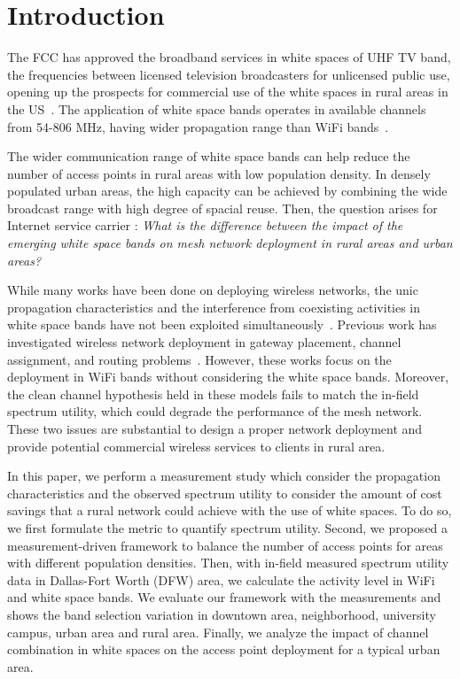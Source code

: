 \section{Introduction}
\label{sec:introduction}



The FCC has approved the broadband services in white spaces of UHF TV band,
the frequencies between licensed television broadcasters 
for unlicensed public use, opening up the prospects for
commercial use of the white spaces in rural areas in the US~\cite{carlson}.
The application of white space bands operates in available channels from 
54-806 MHz, having wider propagation range than
WiFi bands~\cite{balanis2012antenna}. 

The wider communication range 
of white space bands can help reduce the number of access points 
in rural areas with low population density. In densely populated urban areas,
the high capacity can be achieved by combining the wide broadcast range 
with high degree of spacial reuse.
Then, the question arises for Internet service carrier
: {\it What is the difference between the impact of the emerging white 
space bands on mesh network deployment in rural areas and urban areas?} 

While many works have been done on deploying wireless networks,
the unic propagation characteristics and the interference from coexisting 
activities in white space bands have not been exploited simultaneously~\cite{si2010overview}.
Previous work has investigated wireless network deployment in
gateway placement, channel assignment, and routing problems~\cite{he2008optimizing,marina2010topology}. 
However, these works focus on the deployment in WiFi bands without 
considering the white space bands. Moreover, the clean channel 
hypothesis held in these models fails to match the in-field spectrum utility, 
which could degrade the performance of the mesh network. These 
two issues are substantial to design a proper network deployment and 
provide potential commercial wireless services to clients in rural area.

In this paper, we perform a measurement study which consider the propagation 
characteristics and the observed spectrum utility to consider the amount of 
cost savings that a rural network could achieve with the use of white spaces.  
To do so, we first formulate the metric to quantify spectrum utility. 
Second, we proposed a measurement-driven framework to balance the number of 
access points for areas with different population densities. Then, with 
in-field measured spectrum utility data in Dallas-Fort Worth (DFW) area, we 
calculate the activity level in WiFi and white space bands. 
We evaluate our framework with the measurements and shows the band selection 
variation in downtown area, neighborhood, university campus, urban area and 
rural area. Finally, we analyze the impact of channel combination in white 
spaces on the access point deployment for a typical urban area.

